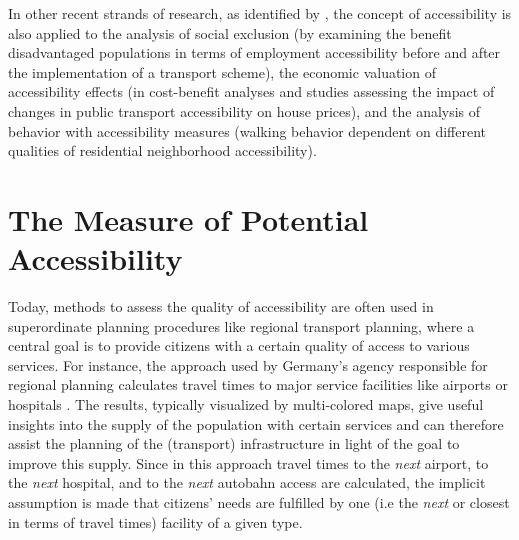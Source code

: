 In other recent strands of research, as identified by \citet{GeursEtAl2012AccessibilityTransportIntroduction}, the concept of 
accessibility is also applied to the analysis of social exclusion (\eg by examining the benefit 
disadvantaged populations in terms of employment accessibility before and after the implementation of a transport scheme), 
the economic valuation of accessibility effects (\eg in cost-benefit analyses and studies assessing the impact of changes in 
public transport accessibility on house prices), and the analysis of behavior with accessibility measures (\eg walking behavior 
dependent on different qualities of residential neighborhood accessibility).




\section{The Measure of Potential Accessibility} 
Today, methods to assess the quality of accessibility are often used in superordinate planning procedures like 
regional transport planning, where a central goal is to provide 
citizens with a certain quality of access to various services. For instance, the approach used by Germany's agency 
responsible for regional planning calculates travel times to major service facilities like airports or hospitals \citep{BBSR20xxErreichbarkeitsmodell}. %
The results, typically visualized by multi-colored maps, give useful insights into the supply of the population with 
certain services and can therefore assist the planning of the (transport) infrastructure in light of the goal to improve 
this supply.
Since in this approach travel times to the \textit{next} airport, to the \textit{next} hospital, and to the \textit{next} 
autobahn access are calculated, the implicit assumption is made that citizens' needs are fulfilled by one (i.e the \textit{next} 
or closest in terms of travel times) facility of a given type.

